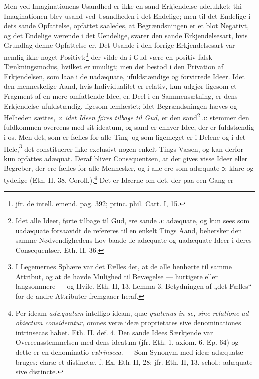 \documentclass[12pt,a4paper]{book}
\newcommand{\opage}[1]{\marginnote{\footnotesize\textit{[#1]}}}
\begin{document}
Men ved Imaginationens Usandhed er ikke en sand Erkjendelse
udelukket; thi Imaginationen blev usand ved Usandheden i det
Endelige; men til det Endelige i dets sande Opfattelse,
opfattet saaledes, at Begrændsningen er et blot Negativt, og
det Endelige værende i det Uendelige, svarer den sande
Erkjendelsesart, hvis Grundlag denne Opfattelse er. Det Usande
i den forrige Erkjendelsesart var nemlig ikke noget
Positivt:\footnote{%
jfr. de intell. emend. pag. 392; princ.
phil. Cart. I, 15.} der vilde da i Gud være en positiv falsk
Tænkningsmodus, hvilket er umuligt; men det bestod i den
Privation af Erkjendelsen, som laae i de uadæquate,
ufuldstændige og forvirrede Ideer. Idet den menneskelige Aand,
hvis Individualitet er relativ, kun udgjør ligesom et Fragment
af en mere omfattende Idee, en Deel i en Sammensætning, er
dens Erkjendelse ufuldstændig, ligesom lemlæstet; idet
Begrændsningen hæves og Helheden sættes, ɔ: \emph{idet Ideen føres
tilbage til Gud,} er den sand\footnote{Idet alle Ideer, førte
tilbage til Gud, ere sande ɔ: adæquate, og kun sees som
uadæquate forsaavidt de refereres til en enkelt Tings Aand,
behersker den samme Nødvendighedens Lov baade de adæquate og
uadæquate Ideer i deres Consequentser. Eth. II, 36.} ɔ:
stemmer den fuldkommen overeens med sit
\opage{92} \setcounter{footnote}{0}%
ideatum, og sand er enhver Idee, der er fuldstændig i os. Men
det, som er fælles for alle Ting, og som ligemeget er i Delene
og i det Hele,\footnote{I Legemernes Sphære var det Fælles
det, at de alle henhørte til samme Attribut, og at de havde
Mulighed til Bevægelse --- hurtigere eller langsommere --- og
Hvile. Eth. II, 13. Lemma 3. Betydningen af „det Fælles“ for
de andre Attributer fremgaaer heraf.} det constituerer ikke
exclusivt nogen enkelt Tings Væsen, og kan derfor kun opfattes
adæquat. Deraf bliver Consequentsen, at der gives visse Ideer
eller Begreber, der ere fælles for alle Mennesker, og i alle
ere som adæquate ɔ: klare og tydelige (Eth. II. 38.
Coroll.).\footnote{Per ideam \emph{adæquatam} intelligo ideam,
quæ \emph{quatenus in se, sine relatione ad obiectum consideratur,}
omnes veræ ideæ proprietates sive denominationes intrinsecas
habet. Eth. II. def. 4. Den sande Idees Særkjende var
Overeensstemmelsen med dens ideatum (jfr. Eth. 1. axiom. 6.
Ep. 64) og dette er en denominatio \emph{extrinseca}. --- Som
Synonym med ideæ adæquatæ bruges: claræ et distinctæ, f. Ex.
Eth. II, 28; jfr. Eth. II, 13. schol.: adæquate sive
distincte.} Det er Ideerne om det, der paa een Gang er
\end{document}
